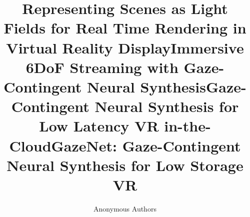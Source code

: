 \title{Representing Scenes as Light Fields for Real Time Rendering in Virtual Reality Display}
\title{Immersive 6DoF Streaming with Gaze-Contingent Neural Synthesis} 
\title{Gaze-Contingent Neural Synthesis for Low Latency VR in-the-Cloud} 
\title{GazeNet: Gaze-Contingent Neural Synthesis for Low Storage VR} 


\author{Anonymous Authors}
